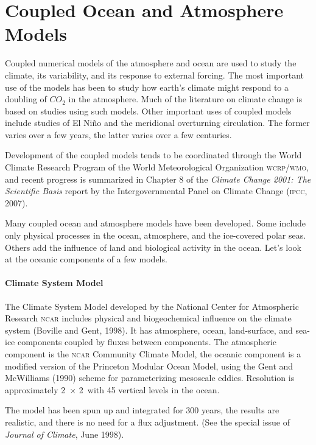 \section{Coupled Ocean and Atmosphere Models}
Coupled numerical models of the
atmosphere and ocean are used to study the climate, its variability,
and its response to external forcing. The most important use of the
models has been to study how earth's climate might respond to a
doubling of $CO_{2}$ in the atmosphere. Much of the literature on
climate change is based on studies using such models. Other important
uses of coupled models include studies of El Ni\~{n}o and the
meridional overturning circulation. The former varies over a few years, the latter varies
over a few centuries.

Development of the coupled models tends to be coordinated through the
World Climate Research Program of the World Meteorological
Organization \textsc{wcrp/wmo}, and recent progress is summarized in
Chapter 8 of the \textit{Climate Change 2001: The Scientific Basis}
report by the Intergovernmental Panel on Climate Change
(\textsc{ipcc}, 2007).

Many coupled ocean and atmosphere models have been developed. Some
include only physical processes in the ocean, atmosphere, and the
ice-covered polar seas. Others add the influence of land and
biological activity in the ocean. Let's look at the oceanic components
of a few models.

\paragraph{Climate System Model} The Climate System Model developed by the National
Center for
Atmospheric Research \textsc{ncar} includes physical and
biogeochemical influence on the climate system (Boville and Gent,
1998). It has atmosphere, ocean, land-surface, and sea-ice components
coupled by fluxes between components. The atmospheric component is the
\textsc{ncar} Community Climate Model, the oceanic component is a
modified version of the Princeton Modular Ocean Model, using the Gent
and McWilliams (1990) scheme for parameterizing mesoscale
eddies. Resolution is approximately
2\degrees\ $\times$ 2\degrees\ with 45 vertical levels in the ocean.

The model has been spun up and integrated for 300 years, the results
are realistic, and there is no need for a flux
adjustment. (See
the special issue of \textit{Journal of Climate}, June 1998).

